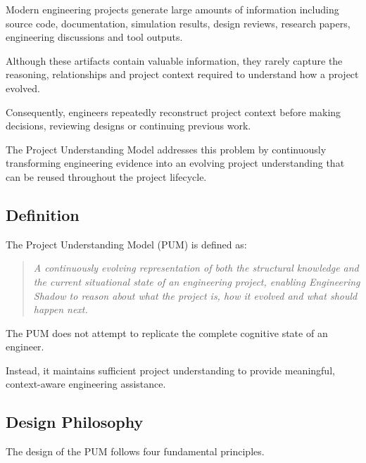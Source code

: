 Modern engineering projects generate large amounts of information including source code, documentation, simulation results, design reviews, research papers, engineering discussions and tool outputs.

Although these artifacts contain valuable information, they rarely capture the reasoning, relationships and project context required to understand how a project evolved.

Consequently, engineers repeatedly reconstruct project context before making decisions, reviewing designs or continuing previous work.

The Project Understanding Model addresses this problem by continuously transforming engineering evidence into an evolving project understanding that can be reused throughout the project lifecycle.


\subsection{Definition}

The Project Understanding Model (PUM) is defined as:

\begin{quote}
\textit{
A continuously evolving representation of both the structural knowledge and the current situational state of an engineering project, enabling Engineering Shadow to reason about what the project is, how it evolved and what should happen next.
}
\end{quote}

The PUM does not attempt to replicate the complete cognitive state of an engineer.

Instead, it maintains sufficient project understanding to provide meaningful, context-aware engineering assistance.


\subsection{Design Philosophy}

The design of the PUM follows four fundamental principles.

